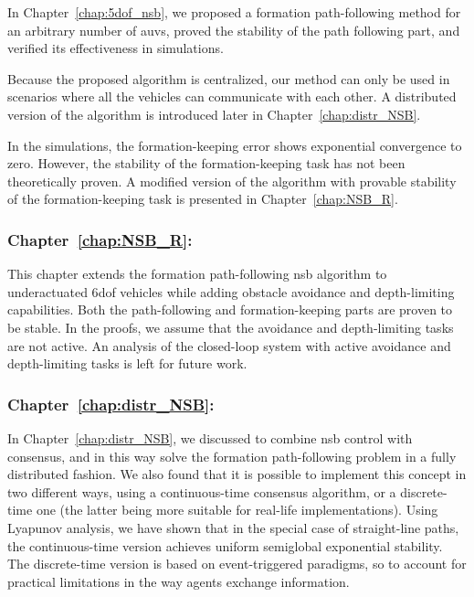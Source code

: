In Chapter~\ref{chap:5dof_nsb}, we proposed a formation path-following method for an arbitrary number of \glspl{auv}, proved the stability of the path following part, and verified its effectiveness in simulations.

Because the proposed algorithm is centralized, our method can only be used in scenarios where all the vehicles can communicate with each other.
A distributed version of the algorithm is introduced later in Chapter~\ref{chap:distr_NSB}.

In the simulations, the formation-keeping error shows exponential convergence to zero.
However, the stability of the formation-keeping task has not been theoretically proven.
A modified version of the algorithm with provable stability of the formation-keeping task is presented in Chapter~\ref{chap:NSB_R}.

\subsubsection{Chapter~\ref{chap:NSB_R}: }

This chapter extends the formation path-following \gls{nsb} algorithm to underactuated 6\gls{dof} vehicles while adding obstacle avoidance and depth-limiting capabilities. 
Both the path-following and formation-keeping parts are proven to be stable.     
In the proofs, we assume that the avoidance and depth-limiting tasks are not active.
An analysis of the closed-loop system with active avoidance and depth-limiting tasks is left for future work.

\subsubsection{Chapter~\ref{chap:distr_NSB}: }

In Chapter~\ref{chap:distr_NSB}, we discussed to combine \acrlong{nsb} control with consensus, and in this way solve the formation path-following problem in a fully distributed fashion. We also found that it is possible to implement this concept in two different ways, using a continuous-time consensus algorithm, or a discrete-time one (the latter being more suitable for real-life implementations).
Using Lyapunov analysis, we have shown that in the special case of straight-line paths, the continuous-time version achieves uniform semiglobal exponential stability.
The discrete-time version is based on event-triggered paradigms, so to account for practical limitations in the way agents exchange information.

